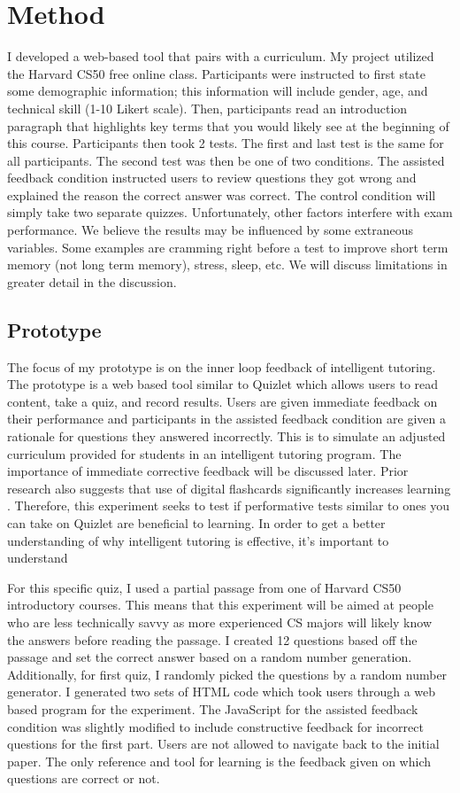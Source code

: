 \documentclass[acmtog]{acmart}
\begin{document}
\section{Method}
I developed a web-based tool that pairs with a curriculum. My project utilized the Harvard CS50 free online class. Participants were instructed to first state some demographic information; this information will include gender, age, and technical skill (1-10 Likert scale). Then, participants read an introduction paragraph that highlights key terms that you would likely see at the beginning of this course. Participants then took 2 tests. The first and last test is the same for all participants. The second test was then be one of two conditions. The assisted feedback condition instructed users to review questions they got wrong and explained the reason the correct answer was correct. The control condition will simply take two separate quizzes. Unfortunately, other factors interfere with exam performance. We believe the results may be influenced by some extraneous variables. Some examples are cramming right before a test to improve short term memory (not long term memory), stress, sleep, etc. We will discuss limitations in greater detail in the discussion.

\subsection{Prototype}
The focus of my prototype is on the inner loop feedback of intelligent tutoring. The prototype is a web based tool similar to Quizlet which allows users to read content, take a quiz, and record results. Users are given immediate feedback on their performance and participants in the assisted feedback condition are given a rationale for questions they answered incorrectly. This is to simulate an adjusted curriculum provided for students in an intelligent tutoring program. The importance of immediate corrective feedback will be discussed later. Prior research also suggests that use of digital flashcards significantly increases learning \cite{yuksel2020digital}. Therefore, this experiment seeks to test if performative tests similar to ones you can take on Quizlet are beneficial to learning. In order to get a better understanding of why intelligent tutoring is effective, it's important to understand 

For this specific quiz, I used a partial passage from one of Harvard CS50 introductory courses. This means that this experiment will be aimed at people who are less technically savvy as more experienced CS majors will likely know the answers before reading the passage. I created 12 questions based off the passage and set the correct answer based on a random number generation. Additionally, for first quiz, I randomly picked the questions by a random number generator. I generated two sets of HTML code  which took users through a web based program for the experiment. The JavaScript for the assisted feedback condition was slightly modified to include constructive feedback for incorrect questions for the first part. Users are not allowed to navigate back to the initial paper. The only reference and tool for learning is the feedback given on which questions are correct or not.
\end{document}
